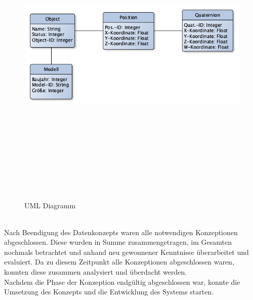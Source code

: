 \begin{figure}[hbt!]
    \centering
    \includegraphics[width=15cm,height=15cm,keepaspectratio]{3Konzeption/Bilder/UML_BA.png}
    \caption{UML Diagramm}
    \label{pic:erm}
\end{figure}
\\
Nach Beendigung des Datenkonzepts waren alle notwendigen Konzeptionen abgeschlossen. Diese wurden in Summe zusammengetragen, im Gesamten nochmals 
betrachtet und anhand neu gewonnener Kenntnisse überarbeitet und evaluiert. Da zu diesem Zeitpunkt alle Konzeptionen abgeschlossen 
waren, konnten diese zusammen analysiert und überdacht werden. 
\\ 
\linebreak
Nachdem die Phase der Konzeption endgültig abgeschlossen war, konnte die Umsetzung des Konzepts und die Entwicklung des Systems starten. 
